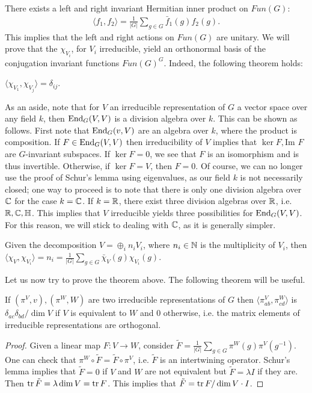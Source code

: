 \documentclass{../mathnotes}
\begin{document}
There exists a left and right invariant Hermitian inner product on $Fun(G)$:
\begin{align*}
    \langle f_1,f_2\rangle =\frac{1}{|G|}\sum_{g\in G}\bar f_1(g)f_2(g).
\end{align*}
This implies that the left and right actions on $Fun(G)$ are unitary. We will prove that the $\chi_{V_i}$, for $V_i$ irreducible, yield
an orthonormal basis of the conjugation invariant functions $Fun(G)^G$. Indeed, the following theorem holds:
    
\begin{thm}
$\langle \chi_{V_1},\chi_{V_j}\rangle=\delta_{ij}$.
\end{thm}


As an aside, note that for $V$ an irreducible representation of $G$ a vector space over any field $k$, then $\operatorname{End}_G(V,V)$ is a division
algebra over $k$. This can be shown as follows. First note that $\operatorname{End}_G(v,V)$ are an algebra over $k$, where the product is composition.
If $F\in\operatorname{End}_G(V,V)$ then irreducibility of $V$ implies that $\ker F,\text{Im }F$ are $G$-invariant subspaces. If $\ker F=0$, we see that $F$
is an isomorphism and is thus invertible. Otherwise, if $\ker F=V$, then $F=0$. Of course, we can no longer use the proof of Schur's lemma
using eigenvalues, as our field $k$ is not necessarily closed; one way to proceed is to note that there is only one division algebra over $\mathbb{C}$ for
the case $k=\mathbb{C}$. If $k=\mathbb{R}$, there exist three division algebras over $\mathbb{R}$, i.e. $\mathbb{R},\mathbb{C},\mathbb{H}$. This implies that $V$ irreducible yields three
possibilities for $\operatorname{End}_G(V,V)$. For this reason, we will stick to dealing with $\mathbb{C}$, as it is generally simpler.

\begin{cor}
    Given the decomposition $V=\oplus_i n_iV_i$, where $n_i\in\mathbb{N}$ is the multiplicity of $V_i$, then $\langle\chi_{V},\chi_{V_i}\rangle=n_i=\frac{1}{|G|}\sum_{g\in G}\bar\chi_V(g)\chi_{V_i}(g)$.
\end{cor}

Let us now try to prove the theorem above. The following theorem will be useful.

\begin{thm}
    If $(\pi^V,v),(\pi^W,W)$ are two irreducible representations of $G$ then $\langle \pi^V_{ab},\pi^W_{cd}\rangle$ is $\delta_{ac}\delta_{bd}/\dim V$ if $V$ is
    equivalent to $W$ and 0 otherwise, i.e. the matrix elements of irreducible representations are orthogonal.
\end{thm}
\begin{proof}
    Given a linear map $F:V\to W$, consider $\tilde F=\frac{1}{|G|}\sum_{g\in G}\pi^W(g)\pi^V(g^{-1})$. One can check that $\pi^W\circ \tilde F=\tilde F\circ \pi^V$,
    i.e. $\tilde F$ is an intertwining operator. Schur's lemma implies that $\tilde F=0$ if $V$ and $W$ are not equivalent but $\tilde F=\lambda I$ if they are.
    Then $\operatorname{tr}\tilde F=\lambda\dim V=\operatorname{tr} F$. This implies that $\tilde F=\operatorname{tr} F/\dim V \cdot I$.
\end{proof}
\end{document}
